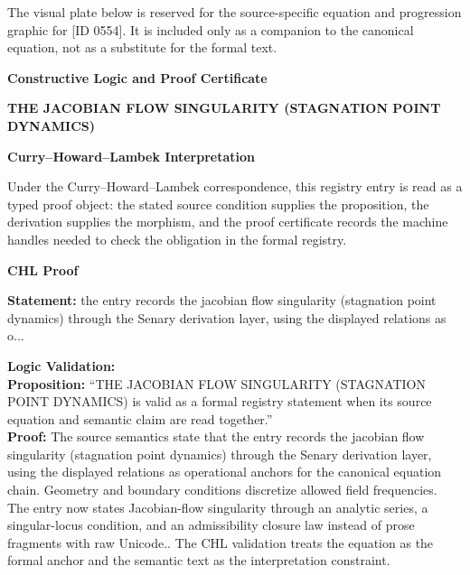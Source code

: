 \begingroup\footnotesize\sloppy
The visual plate below is reserved for the source-specific equation and progression graphic for [ID 0554]. It is included only as a companion to the canonical equation, not as a substitute for the formal text.
\par\endgroup
\ifTZPDarkEdition
{}
\fi

\clearpage
\begingroup\tzpsupportsetup
\noindent\textbf{\fontsize{10.8pt}{12.8pt}\selectfont [ID 0554] Constructive Logic and Proof Certificate}\par
\noindent\textbf{\fontsize{10pt}{12pt}\selectfont THE JACOBIAN FLOW SINGULARITY (STAGNATION POINT DYNAMICS)}\par
\vspace{0.45em}
\begingroup
\footnotesize
\setlength{\parskip}{0.22em}
\setlength{\parindent}{0pt}
\noindent\textbf{Curry--Howard--Lambek Interpretation}\par
Under the Curry--Howard--Lambek correspondence, this registry entry is read as a typed proof
object: the stated source condition supplies the proposition, the derivation supplies the
morphism, and the proof certificate records the machine handles needed to check the obligation
in the formal registry.

\vspace{0.45em}
\noindent\textbf{CHL Proof}\par
\textbf{Statement:} the entry records the jacobian flow singularity (stagnation point dynamics) through the
Senary derivation layer, using the displayed relations as o...

\textbf{Logic Validation:}\\
\textbf{Proposition:} ``THE JACOBIAN FLOW SINGULARITY (STAGNATION POINT DYNAMICS) is valid as a formal registry
statement when its source equation and semantic claim are read together.''\\
\textbf{Proof:} The source semantics state that the entry records the jacobian flow singularity
(stagnation point dynamics) through the Senary derivation layer, using the displayed
relations as operational anchors for the canonical equation chain. Geometry and boundary
conditions discretize allowed field frequencies. The entry now states Jacobian-flow
singularity through an analytic series, a singular-locus condition, and an admissibility
closure law instead of prose fragments with raw Unicode.. The CHL validation treats the
equation as the formal anchor and the semantic text as the interpretation constraint.

